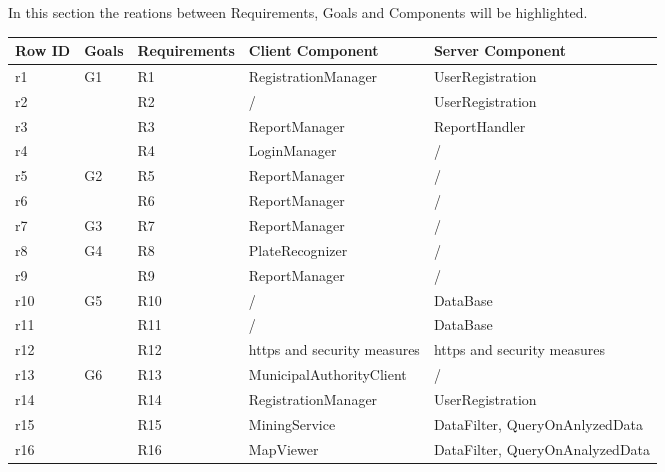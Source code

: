 In this section the reations between Requirements, Goals and Components will be highlighted.\\

\begin{table}[h!]
	\centering
	\begin{tabular}{|l|l|l|l|l|}
	\hline
	\textbf{Row ID}		&	\textbf{Goals}		& \textbf{Requirements}	& \textbf{Client Component}			&\textbf{Server Component}\\ \hline
 			r1						&\multirow{4}{*}{G1}			&   	R1 								&  RegistrationManager								&UserRegistration\\\cline{3-5}\cline{0-0}
 			r2						&											& 		R2								&	 /																&UserRegistration\\\cline{3-5}\cline{0-0}
 			r3						&											&   	R3 								&  ReportManager										&ReportHandler\\\cline{3-5}\cline{0-0}
 			r4						&											&   	R4 								&  LoginManager										&/\\\cline{3-5}\cline{0-0} \hline
 											
 			r5						&\multirow{2}{*}{G2}			&   	R5 								&  ReportManager										&/\\\cline{3-5}\cline{0-0}
 			r6						&											&   	R6 								&  ReportManager										&/\\\cline{3-5} \cline{0-0}\hline
 											
 			r7						&\multirow{1}{*}{G3}			&	   	R7 								&  ReportManager										&/\\\cline{3-5}\cline{0-0}\hline
 	
 			r8						&\multirow{2}{*}{G4}			&   	R8 								&  PlateRecognizer										&/\\\cline{3-5}\cline{0-0}
 			r9						&											&   	R9 								&  ReportManager										&/\\\cline{3-5}\cline{0-0} \hline
 											
 			r10					&\multirow{3}{*}{G5}			&   	R10 								&  /																&DataBase\\\cline{3-5}\cline{0-0}
 			r11					&											&   	R11 								&  /																&DataBase\\\cline{3-5}\cline{0-0}
 			r12					&											&   	R12 								&  https and security measures					&https and security measures\\\cline{3-5}\cline{0-0}\hline
 											
 			r13					&\multirow{4}{*}{G6}			&   	R13 								&  MunicipalAuthorityClient						&/\\\cline{3-5}\cline{0-0}
 			r14					&											&   	R14 								&  RegistrationManager								&UserRegistration\\\cline{3-5}\cline{0-0}
 			r15					&											&   	R15 								&  MiningService										&DataFilter, QueryOnAnlyzedData\\\cline{3-5}\cline{0-0}
 			r16					&											&   	R16 								&  MapViewer												&DataFilter, QueryOnAnalyzedData\\\cline{3-5}\cline{0-0}\hline
 											

\end{tabular}
\end{table}
